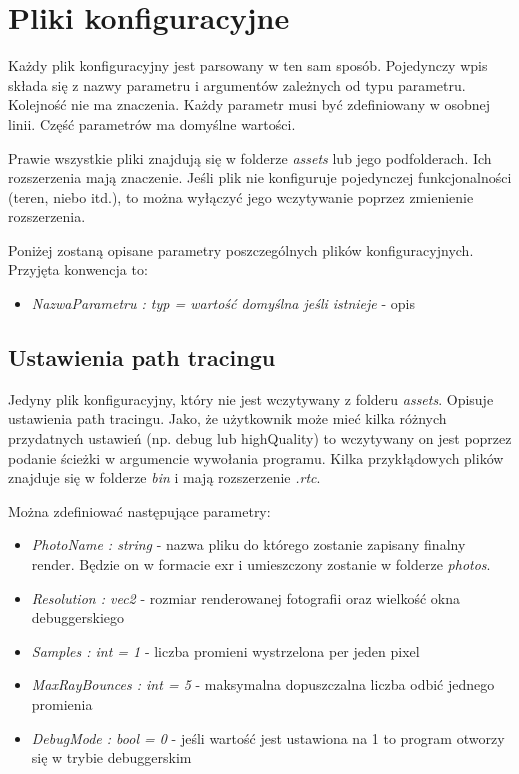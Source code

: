 \documentclass[inz,longabstract]{iithesis}
\begin{document}
    \section{Pliki konfiguracyjne}
        Każdy plik konfiguracyjny jest parsowany w ten sam sposób. Pojedynczy wpis składa się z nazwy parametru i argumentów zależnych od typu parametru. Kolejność nie ma znaczenia. Każdy parametr musi być zdefiniowany w osobnej linii. Część parametrów ma domyślne wartości. 
        
        Prawie wszystkie pliki znajdują się w folderze \textit{assets} lub jego podfolderach. Ich rozszerzenia mają znaczenie. Jeśli plik nie konfiguruje pojedynczej funkcjonalności (teren, niebo itd.), to można wyłączyć jego wczytywanie poprzez zmienienie rozszerzenia.
        
        Poniżej zostaną opisane parametry poszczególnych plików konfiguracyjnych. Przyjęta konwencja to:
        \begin{itemize}
            \item \textit{NazwaParametru : typ = wartość domyślna jeśli istnieje} - opis
        \end{itemize}
        
        \subsection{Ustawienia path tracingu}
        Jedyny plik konfiguracyjny, który nie jest wczytywany z folderu \textit{assets}. Opisuje ustawienia path tracingu. Jako, że użytkownik może mieć kilka różnych przydatnych ustawień (np. debug lub highQuality) to wczytywany on jest poprzez podanie ścieżki w argumencie wywołania programu. Kilka przykłądowych plików znajduje się w folderze \textit{bin} i mają rozszerzenie \textit{.rtc}.
        
        Można zdefiniować następujące parametry:
        \begin{itemize}
            \item \textit{PhotoName : string} - nazwa pliku do którego zostanie zapisany finalny render. Będzie on w formacie exr i umieszczony zostanie w folderze \textit{photos}.
            \item \textit{Resolution : vec2} - rozmiar renderowanej fotografii oraz wielkość okna debuggerskiego
            \item \textit{Samples : int = 1} - liczba promieni wystrzelona per jeden pixel
            \item \textit{MaxRayBounces : int = 5} - maksymalna dopuszczalna liczba odbić jednego promienia  
            \item \textit{DebugMode : bool = 0} - jeśli wartość jest ustawiona na 1 to program otworzy się w trybie debuggerskim
        \end{itemize}
\end{document}
